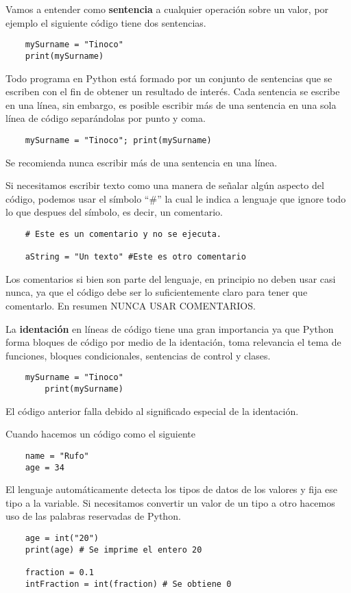 \documentclass[12pt]{article}
\theoremstyle{definition}
\begin{document}
    Vamos a entender como \textbf{sentencia} a cualquier operación sobre un valor, por ejemplo el siguiente código tiene dos sentencias.
    \begin{lstlisting}
    mySurname = "Tinoco"
    print(mySurname)
    \end{lstlisting}

    Todo programa en Python está formado por un conjunto de sentencias que se escriben con el fin de obtener un resultado de interés.
    Cada sentencia se escribe en una línea, sin embargo, es posible escribir más de una sentencia en una sola línea de
    código separándolas por punto y coma.
    \begin{lstlisting}
    mySurname = "Tinoco"; print(mySurname)
    \end{lstlisting}
    Se recomienda nunca escribir más de una sentencia en una línea.

    Si necesitamos escribir texto como una manera de señalar algún aspecto del código, podemos usar el símbolo ``$\#$''
    la cual le indica a lenguaje que ignore todo lo que despues del símbolo, es decir, un comentario.

    \begin{lstlisting}
    # Este es un comentario y no se ejecuta.

    aString = "Un texto" #Este es otro comentario
    \end{lstlisting}
    Los comentarios si bien son parte del lenguaje, en principio no deben usar casi nunca, ya que el código debe ser lo
    suficientemente claro para tener que comentarlo.
    En resumen NUNCA USAR COMENTARIOS.

    La \textbf{identación} en líneas de código tiene una gran importancia ya que Python forma bloques de código por
    medio de la identación, toma relevancia el tema de funciones, bloques condicionales, sentencias de control y clases.

    \begin{lstlisting}
    mySurname = "Tinoco"
        print(mySurname)
    \end{lstlisting}

    El código anterior falla debido al significado especial de la identación.

    Cuando hacemos un código como el siguiente
    \begin{lstlisting}
    name = "Rufo"
    age = 34
    \end{lstlisting}

    El lenguaje automáticamente detecta los tipos de datos de los valores y fija ese tipo a la variable.
    Si necesitamos convertir un valor de un tipo a otro hacemos uso de las palabras reservadas de Python.
    \begin{lstlisting}
    age = int("20")
    print(age) # Se imprime el entero 20

    fraction = 0.1
    intFraction = int(fraction) # Se obtiene 0
    \end{lstlisting}
\end{document}
